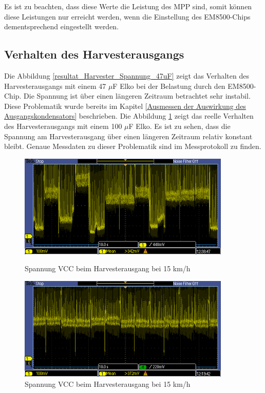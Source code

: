 Es ist zu beachten, dass diese Werte die Leistung des MPP sind, somit können diese Leistungen nur erreicht werden, wenn die Einstellung des EM8500-Chips dementsprechend eingestellt werden.


\subsection{Verhalten des Harvesterausgangs}

Die Abbildung \ref{resultat_Harvester_Spannung_47uF} zeigt das Verhalten des Harvesterausgangs mit einem 47 $\mu$F Elko bei der Belastung durch den EM8500-Chip. Die Spannung ist über einen längeren Zeitraum betrachtet sehr instabil. Diese Problematik wurde bereits im Kapitel \ref{Ausmessen der Auswirkung des Ausgangskondensators} beschrieben. Die Abbildung \ref{resultat_Harvester_Spannung_100uF} zeigt das reelle Verhalten des Harvesterausgangs mit einem 100 $\mu$F Elko. Es ist zu sehen, dass die Spannung am Harvesterausgang über einen längeren Zeitraum relativ konstant bleibt. Genaue Messdaten zu dieser Problematik sind im Messprotokoll \cite{messung_harvester_elko} zu finden.

\begin{figure}[ht]
 \begin{minipage}[t]{0.5\textwidth}
    \includegraphics[width=0.9\textwidth]{4Resultate/imag/SpannungVCC_47uF.PNG} 
    \caption{Spannung VCC beim Harvesterausgang bei 15 km/h}
    \label{resultat_Harvester_Spannung_47uF}
 \end{minipage}
 \begin{minipage}[t]{0.5\textwidth}
    \includegraphics[width=0.9\textwidth]{4Resultate/imag/SpannungVCC_100uF.png} 
    \caption{Spannung VCC beim Harvesterausgang bei 15 km/h}
    \label{resultat_Harvester_Spannung_100uF}
 \end{minipage}
\end{figure}

